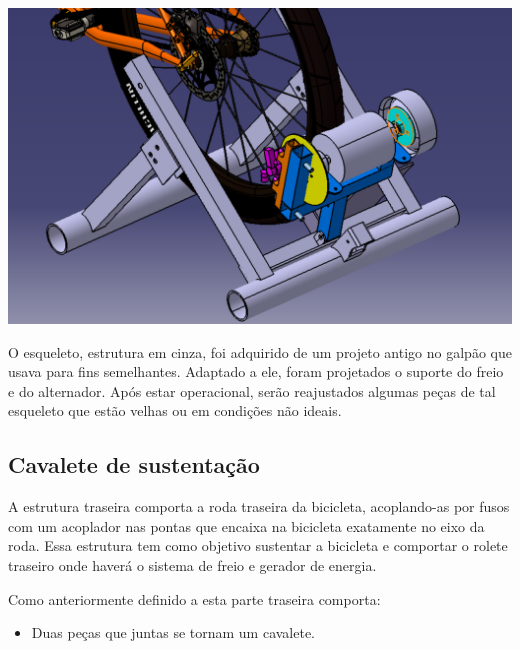     \begin{center}
    	\includegraphics[scale=0.5]{figuras/parte_traseira}
        \label{parte_traseira_1}
    \end{center}    

    O esqueleto, estrutura em cinza, foi adquirido de um projeto antigo no galpão que usava para fins semelhantes. Adaptado a ele, foram projetados o suporte do freio e do alternador. Após estar operacional, serão reajustados algumas peças de tal esqueleto que estão velhas ou em condições não ideais.

\subsection{Cavalete de sustentação}

    A estrutura traseira comporta a roda traseira da bicicleta, acoplando-as por fusos com um acoplador nas pontas que encaixa na bicicleta exatamente no eixo da roda. Essa estrutura tem como objetivo sustentar a bicicleta e comportar o rolete traseiro onde haverá o sistema de freio e gerador de energia.

    Como anteriormente definido a esta parte traseira comporta:
    \begin{itemize}
        \item Duas peças que juntas se tornam um cavalete.
    \end{itemize}
    
